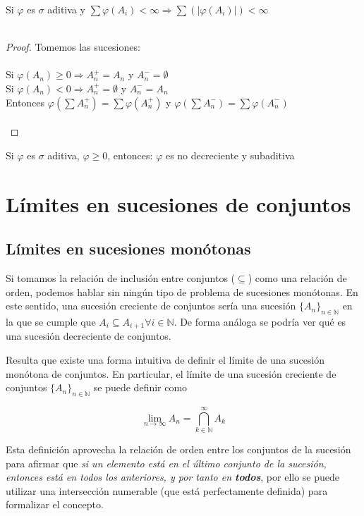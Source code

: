 \documentclass[12pt,a4paper,openright]{book}
\begin{document}
\begin{theorem}
Si $\varphi$ es $\sigma$ aditiva y $\displaystyle\sum\varphi(A_i)<\infty\Rightarrow\displaystyle\sum(\vert \varphi(A_i)\vert)<\infty$\\\\
\end{theorem}
\begin{proof}
Tomemos las sucesiones: \\\\
Si $\varphi(A_n)\geq 0 \Longrightarrow A_n^{+}=A_n$ y $A_n^{-}=\emptyset$\\
Si $\varphi(A_n)<0 \Longrightarrow A_n^{+}=\emptyset$ y $A_n^{-}=A_n$\\
Entonces $\varphi(\displaystyle\sum A_n^{+})=\displaystyle\sum\varphi(A_n^{+})$ y $\varphi(\displaystyle\sum A_n^{-})=\displaystyle\sum\varphi(A_n^{-})$\\\\
\end{proof}

\begin{theorem} 
Si $\varphi$ es $\sigma$ aditiva, $\varphi\geq 0$, entonces: $\varphi$ es no decreciente y subaditiva
\end{theorem}

\section{Límites en sucesiones de conjuntos}
\subsection{Límites en sucesiones monótonas}
Si tomamos la relación de inclusión entre conjuntos ($\subseteq$) como una relación de orden, podemos hablar sin ningún tipo de problema de sucesiones monótonas. En este sentido, una sucesión creciente de conjuntos sería una sucesión $\{A_n\}_{n \in \mathbb{N}}$ en la que se cumple que $A_i \subseteq A_{i+1} \forall i \in \mathbb{N}$. De forma análoga se podría ver qué es una sucesión decreciente de conjuntos.

Resulta que existe una forma intuitiva de definir el límite de una sucesión monótona de conjuntos. En particular, el límite de una sucesión creciente de conjuntos $\{A_n\}_{n \in \mathbb{N} }$ se puede definir como 


$$\lim_{n\to\infty} A_n = \bigcap_{k \in \mathbb{N}}^{\infty} A_k$$


Esta definición aprovecha la relación de orden entre los conjuntos de la sucesión para afirmar que \textit{si un elemento está en el último conjunto de la sucesión, entonces está en todos los anteriores, y por tanto en \textbf{todos}}, por ello se puede utilizar una intersección numerable (que está perfectamente definida) para formalizar el concepto.
\end{document}

